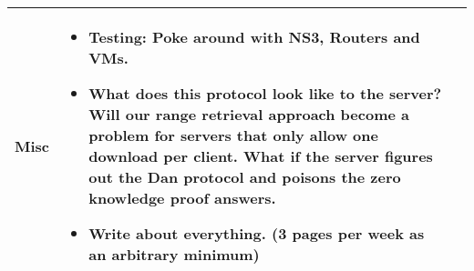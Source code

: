 \documentclass[a4wide,10pt]{extarticle}
\begin{document}
\begin{center}
\begin{tabular}{| m{3.0cm} | m{12.6cm} | m{2cm}|}
Misc &
	\begin{itemize}
		\item Testing: Poke around with NS3, Routers and VMs.
		\item What does this protocol look like to the server? Will our range retrieval approach become a problem for servers that only allow one download per client. What if the server figures out the Dan protocol and poisons the zero knowledge proof answers.
		\item Write about everything. (3 pages per week as an arbitrary minimum)
	\end{itemize}
\\ \hline

\end{tabular}
\end{center}
\end{document}
